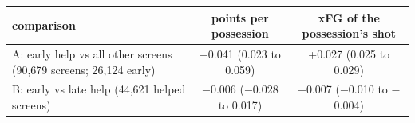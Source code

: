\begin{tabular}{lcc}
\hline
comparison & points per possession & xFG of the possession's shot \\
\hline
A: early help vs all other screens (90,679 screens; 26,124 early) & +0.041 (0.023 to 0.059) & +0.027 (0.025 to 0.029) \\
B: early vs late help (44,621 helped screens) & $-$0.006 ($-$0.028 to 0.017) & $-$0.007 ($-$0.010 to $-$0.004) \\
\hline
\end{tabular}
